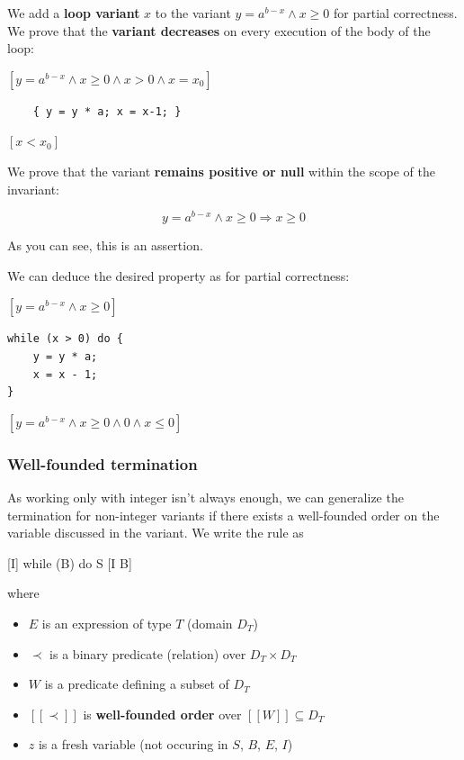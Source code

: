 \documentclass[12pt, a4paper]{book}
\begin{document}
    \bigskip

    We add a \textbf{loop variant} $x$ to the variant $y = {a}^{b-x} \land x \ge 0$
    for partial correctness. We prove that the \textbf{variant decreases} on
    every execution of the body of the loop: \newline

    $[y = {a}^{b-x} \land x \ge 0 \land x > 0 \land x = {x}_{0}]$
\begin{lstlisting}
    { y = y * a; x = x-1; }
\end{lstlisting}
    $[x < {x}_{0}]$

    \bigskip

    We prove that the variant \textbf{remains positive or null} within the
    scope of the invariant:

    $$
    y = {a}^{b-x} \land x \ge 0 \Rightarrow x \ge 0
    $$

    As you can see, this is an assertion.

    We can deduce the desired property as for partial correctness:

    $[y = {a}^{b-x} \land x \ge 0]$
\begin{lstlisting}
while (x > 0) do {
    y = y * a;
    x = x - 1;
}
\end{lstlisting}
    $[y = {a}^{b-x} \land x \ge 0 \land 0 \land x \le 0]$

    \subsubsection{Well-founded termination}

    As working only with integer isn't always enough, we can generalize the
    termination for non-integer variants if there exists a well-founded order
    on the variable discussed in the variant. We write the rule as

    \begin{framed}
        {[I] \textrm{ while } (B) do S [I \land\lnot{} B]}
    \end{framed}

    where
    \begin{itemize}
        \item $E$ is an expression of type $T$ (domain ${D}_{T}$)
        \item $\prec$ is a binary predicate (relation) over ${D}_{T} \times {D}_{T}$
        \item $W$ is a predicate defining a subset of $D_T$
        \item $[[\prec]]$ is \textbf{well-founded order} over $[[W]] \subseteq {D}_T$
        \item $z$ is a fresh variable (not occuring in $S$, $B$, $E$, $I$)
    \end{itemize}
\end{document}

